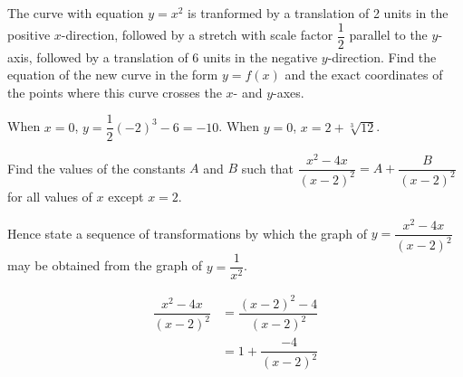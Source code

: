 \documentclass{echw}
\begin{document}

    \problem{}
        The curve with equation $y=x^2$ is tranformed by a translation of 2 units in the positive $x$-direction, followed by a stretch with scale factor $\dfrac12$ parallel to the $y$-axis, followed by a translation of 6 units in the negative $y$-direction. Find the equation of the new curve in the form $y = f(x)$ and the exact coordinates of the points where this curve crosses the $x$- and $y$-axes.

    \solution       
        \begin{center}
        \end{center}


        When $x=0$, $y = \dfrac12 (-2)^3 - 6 = -10$. When $y = 0$, $x = 2 + \sqrt[3]{12}$.


    \problem{}
        Find the values of the constants $A$ and $B$ such that $\dfrac{x^2-4x}{(x-2)^2} = A + \dfrac{B}{(x-2)^2}$ for all values of $x$ except $x=2$.

        Hence state a sequence of transformations by which the graph of $y = \dfrac{x^2-4x}{(x-2)^2}$ may be obtained from the graph of $y = \dfrac1{x^2}$.

    \solution
        \begin{align*}
            \dfrac{x^2-4x}{(x-2)^2} &= \dfrac{(x-2)^2 - 4}{(x-2)^2} \\ 
            &= 1 + \dfrac{- 4}{(x-2)^2} \\ 
        \end{align*}

\end{document}
